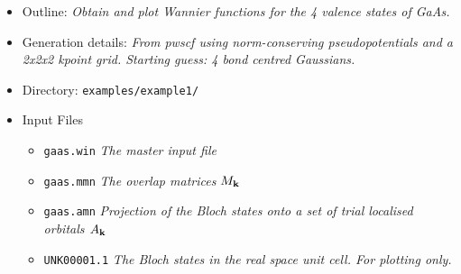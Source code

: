 \documentclass[a4paper,11pt,twoside]{article}
\begin{document}
\begin{itemize}
\item{Outline: \it{Obtain and plot Wannier functions for the 4 valence states of GaAs.}}
\item{Generation details: \it{From pwscf using norm-conserving pseudopotentials
and a 2x2x2 kpoint grid. Starting guess: 4 bond centred Gaussians.}}
\item{Directory: {\tt examples/example1/}}
\item{Input Files}
\begin{itemize}
\item{ {\tt gaas.win}  {\it The master input file}}
\item{ {\tt gaas.mmn}  {\it The overlap matrices $M_{{\bf k}}$}}
\item{ {\tt gaas.amn}  {\it Projection of the Bloch states onto a set of trial localised orbitals $A_{{\bf k}}$}}
\item{ {\tt UNK00001.1}  {\it The Bloch states in the real space unit cell. For plotting only.}}
\end{itemize}
\end{itemize}
\end{document}
